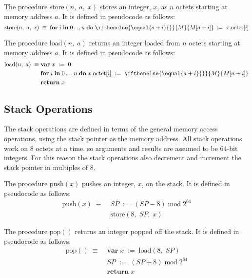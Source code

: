 \documentclass[a4paper,10pt]{article}
\newcommand{\MEM}[1]{\ifthenelse{\equal{#1}{}}{M}{M[#1]}}
\newcommand{\SP}{SP}
\newcommand{\octno}[2]{#1.\mathrm{octet}[#2]}
\newcommand{\set}[2]{#1\;:=\;#2}
\newcommand{\Var}[2]{\mathbf{var}\;#1\;:=\;#2\;}
\newcommand{\dotimes}[4]{\mathbf{for}\;#1\;\mathbf{in}\;#2\ldots#3\;\mathbf{do}\;#4}
\newcommand{\return}[1]{\mathbf{return} \; #1}
\newcommand{\Put}[3]{\mathrm{store}(#1,\;#2,\;#3)}
\newcommand{\Get}[2]{\mathrm{load}(#1,\;#2)}
\newcommand{\Push}[1]{\mathrm{push}(#1)}
\newcommand{\Pop}{\mathrm{pop}()}
\DeclareMathOperator{\Mod}{mod}
\newcommand{\modulo}[2]{#1 \Mod #2}
\theoremstyle{definition}
\begin{document}
The procedure $\Put{n}{a}{x}$ stores an integer, $x$, as $n$ octets starting at memory address $a$.
It is defined in pseudocode as follows:
\begin{equation}
  \Put{n}{a}{x} \; \equiv \; \dotimes{i}{0}{n}{\set{\MEM{a + i}}{\octno{x}{i}}}
\end{equation}

The procedure $\Get{n}{a}$ returns an integer loaded from $n$ octets starting at memory address $a$.
It is defined in pseudocode as follows:
\begin{equation}
  \begin{split}
  \Get{n}{a} \; \equiv \; & \Var{x}{0} \\
  & \dotimes{i}{0}{n}{\set{\octno{x}{i}}{\MEM{a + i}}} \\
  & \return{x}
  \end{split}
\end{equation}

\subsection{Stack Operations}

The stack operations are defined in terms of the general memory access operations, using the stack pointer as the memory address.
All stack operations work on 8 octets at a time, so arguments and results are assumed to be 64-bit integers.
For this reason the stack operations also decrement and increment the stack pointer in multiples of 8.

The procedure $\Push{x}$ pushes an integer, $x$, on the stack.
It is defined in pseudocode as follows:
\begin{equation}
  \begin{split}
    \Push{x} \; \equiv \; & \set{\SP}{\modulo{(\SP-8)}{2^{64}}} \\
                       & \Put{8}{\SP}{x}
  \end{split}
\end{equation}

The procedure $\Pop{}$ returns an integer popped off the stack.
It is defined in pseudocode as follows:
\begin{equation}
  \begin{split}
    \Pop{} \; \equiv \; & \Var{x}{\Get{8}{\SP}} \\
    & \set{\SP}{\modulo{(\SP+8)}{2^{64}}} \\
    & \return{x}
  \end{split}
\end{equation}
\end{document}
